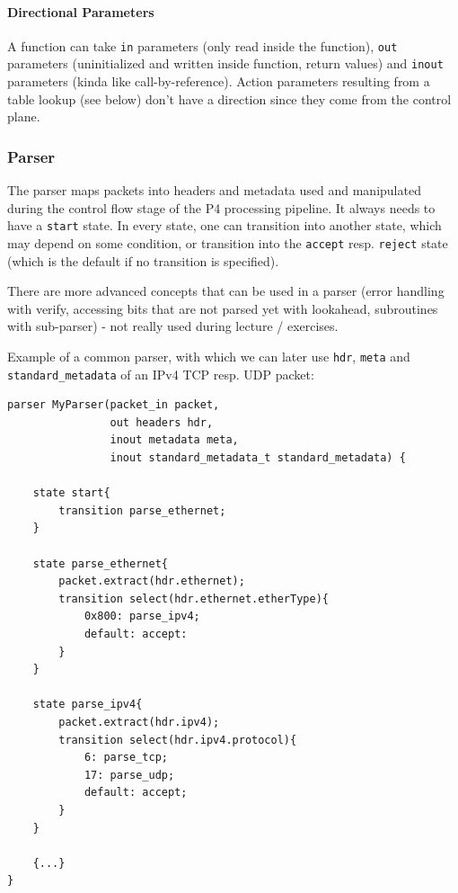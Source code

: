 
\paragraph{Directional Parameters}
A function can take \texttt{in} parameters (only read inside the function), \texttt{out} parameters (uninitialized and written inside function, return values) and \texttt{inout} parameters (kinda like call-by-reference). Action parameters resulting from a table lookup (see below) don't have a direction since they come from the control plane.

\subsubsection{Parser}


The parser maps packets into headers and metadata used and manipulated during the control flow stage of the P4 processing pipeline. It always needs to have a \texttt{start} state. In every state, one can transition into another state, which may depend on some condition, or transition into the \texttt{accept} resp. \texttt{reject} state (which is the default if no transition is specified). 

There are more advanced concepts that can be used in a parser (error handling with verify, accessing bits that are not parsed yet with lookahead, subroutines with sub-parser) - not really used during lecture / exercises. %

Example of a common parser, with which we can later use \texttt{hdr}, \texttt{meta} and \texttt{standard\_metadata} of an IPv4 TCP resp. UDP packet:

\begin{lstlisting}
parser MyParser(packet_in packet,
                out headers hdr,
                inout metadata meta,
                inout standard_metadata_t standard_metadata) {

    state start{
        transition parse_ethernet;
    }
    
    state parse_ethernet{
        packet.extract(hdr.ethernet);
        transition select(hdr.ethernet.etherType){
            0x800: parse_ipv4;
            default: accept:
        }
    }
    
    state parse_ipv4{
        packet.extract(hdr.ipv4);
        transition select(hdr.ipv4.protocol){
            6: parse_tcp;
            17: parse_udp;
            default: accept;
        }
    }
    
    {...}
}

\end{lstlisting}



